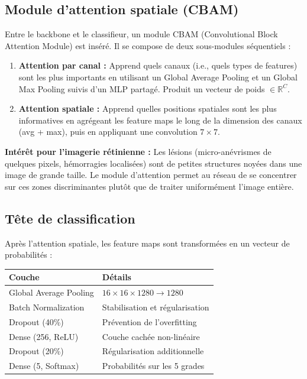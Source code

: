 ﻿\documentclass[11pt,a4paper]{article}
\begin{document}
\subsection{Module d'attention spatiale (CBAM)}

Entre le backbone et le classifieur, un module CBAM (Convolutional Block Attention Module) est inséré. Il se compose de deux sous-modules séquentiels :

\begin{enumerate}[leftmargin=2em]
  \item \textbf{Attention par canal :} Apprend quels canaux (i.e., quels types de features) sont les plus importants en utilisant un Global Average Pooling et un Global Max Pooling suivis d'un MLP partagé. Produit un vecteur de poids $\in \mathbb{R}^C$.

  \item \textbf{Attention spatiale :} Apprend quelles positions spatiales sont les plus informatives en agrégeant les feature maps le long de la dimension des canaux (avg + max), puis en appliquant une convolution $7 \times 7$.
\end{enumerate}

\textbf{Intérêt pour l'imagerie rétinienne :} Les lésions (micro-anévrismes de quelques pixels, hémorragies localisées) sont de petites structures noyées dans une image de grande taille. Le module d'attention permet au réseau de se concentrer sur ces zones discriminantes plutôt que de traiter uniformément l'image entière.

\subsection{Tête de classification}

Après l'attention spatiale, les feature maps sont transformées en un vecteur de probabilités :

\begin{center}
\renewcommand{\arraystretch}{1.4}
\begin{tabular}{ll}
\toprule
\textbf{Couche} & \textbf{Détails} \\
\midrule
Global Average Pooling & $16 \times 16 \times 1280 \to 1280$ \\
Batch Normalization & Stabilisation et régularisation \\
Dropout (40\%) & Prévention de l'overfitting \\
Dense (256, ReLU) & Couche cachée non-linéaire \\
Dropout (20\%) & Régularisation additionnelle \\
Dense (5, Softmax) & Probabilités sur les 5 grades \\
\bottomrule
\end{tabular}
\end{center}
\end{document}
